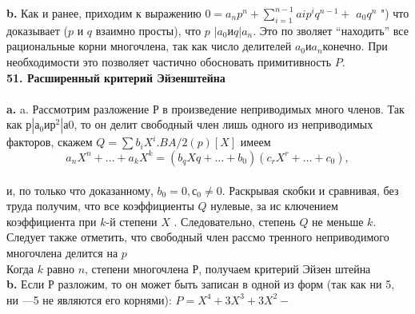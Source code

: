 \hspace*{15pt}\textbf{b.} Как и ранее, приходим к выражению $0 = a_{n}p^{n} + \sum^{n-1}_{i=1}a{i}p^{i}q^{n-1}+$\linebreak
$a_{0}q^n$ ") что доказывает ($p$ и $q$ взаимно просты), что $p$ $| a_0 и q | a_n$. Это по­\linebreak
зволяет “находить” все рациональные корни многочлена, так как число\linebreak
делителей $a_0 и a_n $конечно. При необходимости это позволяет частично\linebreak
обосновать примитивность $P$.\\
\newpage
\noindent\textbf{51. Расширенный критерий Эйзенштейна}\\
\\
\hspace*{15pt}\textbf{a.} a. Рассмотрим разложение $Р$ в произведение неприводимых много­\linebreak
членов. Так как $р | а_0 и р^{2} |а0$, то он делит свободный член лишь одного\linebreak
из неприводимых факторов, скажем  $Q = \sum b_{i}X^{i}. B A/2(p)[X]$ имеем
$$a_{n}X^{n}+\ldots+a_{k}X^{k} = (b_{q}X{q}+\ldots+b_0)(c_{r}X^{r}+\ldots+c_0),$$
\\
\noindent и, по только что доказанному, $b_0 = 0, с_0 \neq 0.$ Раскрывая скобки и\linebreak
сравнивая, без труда получим, что все коэффициенты $Q$ нулевые, за ис­\linebreak
ключением коэффициента при $k$-й степени $X$ . Следовательно, степень\linebreak
$Q$ не меньше $k$. Следует также отметить, что свободный член рассмо­\linebreak
тренного неприводимого многочлена делится на $p$\\
\hspace*{0pt} Когда $k$ равно $n$, степени многочлена $Р$, получаем критерий Эйзен­\linebreak
штейна\\
\hspace*{15pt}\textbf{b.} Если $Р$ разложим, то он может быть записан в одной из форм\linebreak
(так как ни 5, ни —5 не являются его корнями): $P = X^{4} + 3X^{3} + 3X^{2} -$\linebreak
